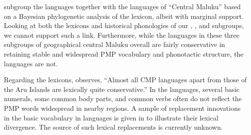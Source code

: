\citet{GrayGreenhill2009} subgroup the  languages together with the languages
of “Central Maluku” based on a Bayesian phylogenetic analysis
of the lexicon, albeit with marginal support.
Looking at both the lexicons
and historical phonologies of our ,
, and  subgroups,
we cannot support such a link.
Furthermore, while the languages in these three subgroups of
geographical central Maluku overall are fairly conservative in
retaining stable and widespread PMP vocabulary
and phonotactic structure, the  languages are not.

Regarding the lexicons, \citet[245]{Blust1993} observes,
“Almost all CMP languages apart from those of the Aru Islands
are lexically quite conservative.” In the  languages,
several basic numerals, some common body parts,
and common verbs often do not reflect the PMP words widespread in nearby regions.
A sample of replacement innovations in the basic vocabulary in
 languages is given in  to illustrate their lexical divergence.
The source of such lexical replacements is currently unknown.

